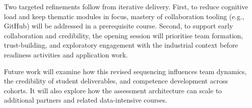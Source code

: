 Two targeted refinements follow from iterative delivery. First, to reduce cognitive load and keep thematic modules in focus, mastery of collaboration tooling (e.g., GitHub) will be addressed in a prerequisite course. Second, to support early collaboration and credibility, the opening session will prioritise team formation, trust-building, and exploratory engagement with the industrial context before readiness activities and application work.

Future work will examine how this revised sequencing influences team dynamics, the credibility of student deliverables, and competence development across cohorts. It will also explore how the assessment architecture can scale to additional partners and related data-intensive courses.